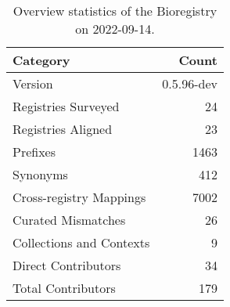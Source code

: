 \begin{table}
\centering
\caption{Overview statistics of the Bioregistry on 2022-09-14.}
\label{tab:bioregistry-summary}
\begin{tabular}{lr}
\toprule
                Category &      Count \\
\midrule
                 Version & 0.5.96-dev \\
     Registries Surveyed &         24 \\
      Registries Aligned &         23 \\
                Prefixes &       1463 \\
                Synonyms &        412 \\
 Cross-registry Mappings &       7002 \\
      Curated Mismatches &         26 \\
Collections and Contexts &          9 \\
     Direct Contributors &         34 \\
      Total Contributors &        179 \\
\bottomrule
\end{tabular}
\end{table}
